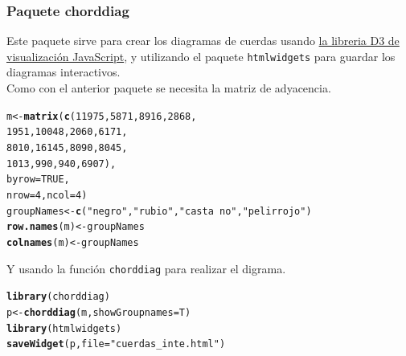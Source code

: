 \documentclass{article}\usepackage[]{graphicx}\usepackage[]{color}
\makeatletter
\newcommand{\hlnum}[1]{\textcolor[rgb]{0.686,0.059,0.569}{#1}}%
\newcommand{\hlstr}[1]{\textcolor[rgb]{0.192,0.494,0.8}{#1}}%
\newcommand{\hlstd}[1]{\textcolor[rgb]{0.345,0.345,0.345}{#1}}%
\newcommand{\hlkwb}[1]{\textcolor[rgb]{0.69,0.353,0.396}{#1}}%
\newcommand{\hlkwc}[1]{\textcolor[rgb]{0.333,0.667,0.333}{#1}}%
\newcommand{\hlkwd}[1]{\textcolor[rgb]{0.737,0.353,0.396}{\textbf{#1}}}%
\newenvironment{kframe}{%
 \def\at@end@of@kframe{}%
 \ifinner\ifhmode%
  \def\at@end@of@kframe{\end{minipage}}%
  \begin{minipage}{\columnwidth}%
 \fi\fi%
 \def\FrameCommand##1{\hskip\@totalleftmargin \hskip-\fboxsep
 \colorbox{shadecolor}{##1}\hskip-\fboxsep
     \hskip-\linewidth \hskip-\@totalleftmargin \hskip\columnwidth}%
 \MakeFramed {\advance\hsize-\width
   \@totalleftmargin\z@ \linewidth\hsize
   \@setminipage}}%
 {\par\unskip\endMakeFramed%
 \at@end@of@kframe}
\newenvironment{knitrout}{}{} %
\makeatother
\begin{document}
\subsubsection{Paquete chorddiag}
Este paquete %
sirve para crear los diagramas de cuerdas usando \href{https://d3js.org/}{la libreria D3 de visualizaci\'on JavaScript}, y utilizando el paquete \texttt{htmlwidgets} para guardar los diagramas interactivos.~\\
Como con el anterior paquete se necesita la matriz de adyacencia.
\begin{knitrout}
\color{fgcolor}\begin{kframe}
\begin{alltt}
\hlstd{m} \hlkwb{<-} \hlkwd{matrix}\hlstd{(}\hlkwd{c}\hlstd{(}\hlnum{11975}\hlstd{,}  \hlnum{5871}\hlstd{,} \hlnum{8916}\hlstd{,} \hlnum{2868}\hlstd{,}
              \hlnum{1951}\hlstd{,} \hlnum{10048}\hlstd{,} \hlnum{2060}\hlstd{,} \hlnum{6171}\hlstd{,}
              \hlnum{8010}\hlstd{,} \hlnum{16145}\hlstd{,} \hlnum{8090}\hlstd{,} \hlnum{8045}\hlstd{,}
              \hlnum{1013}\hlstd{,}   \hlnum{990}\hlstd{,}  \hlnum{940}\hlstd{,} \hlnum{6907}\hlstd{),}
            \hlkwc{byrow} \hlstd{=} \hlnum{TRUE}\hlstd{,}
            \hlkwc{nrow} \hlstd{=} \hlnum{4}\hlstd{,} \hlkwc{ncol} \hlstd{=} \hlnum{4}\hlstd{)}
\hlstd{groupNames} \hlkwb{<-} \hlkwd{c}\hlstd{(}\hlstr{"negro"}\hlstd{,} \hlstr{"rubio"}\hlstd{,} \hlstr{"casta~no"}\hlstd{,} \hlstr{"pelirrojo"}\hlstd{)}
\hlkwd{row.names}\hlstd{(m)} \hlkwb{<-} \hlstd{groupNames}
\hlkwd{colnames}\hlstd{(m)} \hlkwb{<-} \hlstd{groupNames}
\end{alltt}
\end{kframe}
\end{knitrout}
Y usando la funci\'on \texttt{chorddiag} para realizar el digrama.
\begin{knitrout}
\color{fgcolor}\begin{kframe}
\begin{alltt}
\hlkwd{library}\hlstd{(chorddiag)}
\hlstd{p} \hlkwb{<-} \hlkwd{chorddiag}\hlstd{(m,} \hlkwc{showGroupnames} \hlstd{= T)}
\hlkwd{library}\hlstd{(htmlwidgets)}
\hlkwd{saveWidget}\hlstd{(p,} \hlkwc{file} \hlstd{=} \hlstr{"cuerdas_inte.html"}\hlstd{)}
\end{alltt}
\end{kframe}
\end{knitrout}
\end{document}
